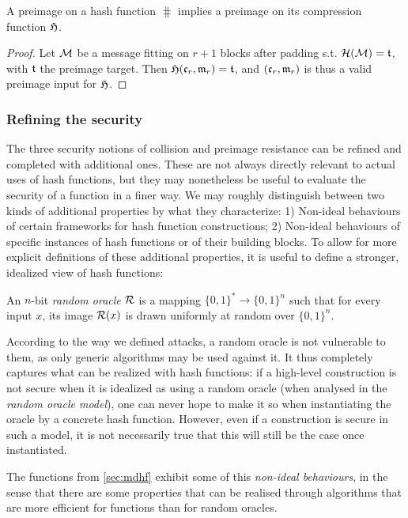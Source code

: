 \begin{prop}
A preimage on a \merkdam hash function $\hash$ implies a preimage on its compression function $\operatorname{\mathfrak{H}}$.
\end{prop}
\begin{proof}
Let $\mathcal{M}$ be a message fitting on $r+1$ blocks after padding s.t. $\operatorname{\mathcal{H}}(\mathcal{M}) = \mathfrak{t}$, with $\mathfrak{t}$ the preimage target.
Then $\operatorname{\mathfrak{H}}(\mathfrak{c}_r, \mathfrak{m}_r) = \mathfrak{t}$, and $(\mathfrak{c}_r, \mathfrak{m}_r)$ is thus a valid preimage input for $\operatorname{\mathfrak{H}}$.
\end{proof}

\subsubsection{Refining the security}
\label{sec:refining_md}

The three security notions of collision and preimage resistance can be refined and completed with additional ones. These are not always directly relevant to actual uses of hash functions, but they may nonetheless be useful to evaluate the security
of a function in a finer way. We may roughly distinguish between two kinds of additional properties by what they characterize: 1) Non-ideal behaviours of certain frameworks for hash function constructions; 2) Non-ideal
behaviours of specific instances of hash functions or of their building blocks.
To allow for more explicit definitions of these additional properties, it is useful to define a stronger, idealized view of hash functions:

\begin{defi}
An $n$-bit \emph{random oracle} $\operatorname{\mathcal{R}}$ is a mapping $\{0,1\}^* \rightarrow \{0,1\}^n$ such that for every input $x$, its image $\operatorname{\mathcal{R}}(x)$ is drawn uniformly at random over $\{0,1\}^n$.
\end{defi}

According to the way we defined attacks, a random oracle is not vulnerable to them, as only generic algorithms may be used against it. It thus completely captures what
can be realized with hash functions: if a high-level construction is not secure when it is idealized as using a random oracle (when analysed in the \emph{random oracle model}),
one can never hope to make it so when instantiating the oracle by a concrete hash function. However, even if a construction is secure in such a model, it is not necessarily true that
this will still be the case once instantiated.

The \merkdam functions from \autoref{sec:mdhf} exhibit some of this \emph{non-ideal behaviours},
in the sense that there are some properties that can be realised through algorithms that are more efficient for \merkdam functions than for random oracles.

